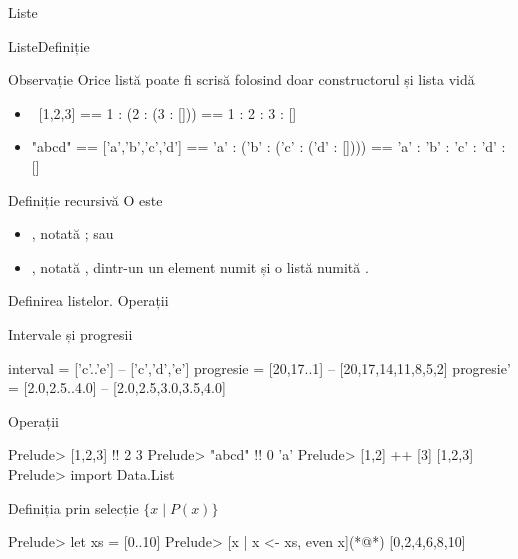 \documentclass[xcolor=pdftex,romanian,colorlinks]{beamer}
\begin{document}
\begin{section}{Liste}
\begin{frame}{Liste}{Definiție}
\begin{block}
{Observație}
Orice listă poate fi scrisă folosind doar constructorul \structure{(:)} și lista vidă \structure{[]}
\begin{itemize}
\item\ [1,2,3] == 1 : (2 : (3 : [])) == 1 : 2 : 3 : []
\item "abcd" == ['a','b','c','d'] == 'a' : ('b' : ('c' : ('d' : []))) == 'a' : 'b' : 'c' : 'd' : []
\end{itemize}
\end{block}
\vfill
\begin{block}{Definiție recursivă}
O  este
\begin{itemize}
\item {}, notată \structure{[]}; sau
\item {}, notată , dintr-un un element  numit  și o listă  numită .
\end{itemize}
\end{block}
\vfill
\end{frame}

\begin{frame}[fragile]{Definirea listelor. Operații}
\begin{block}{ Intervale și progresii}
\begin{asciihs}
interval = ['c'..'e']       -- ['c','d','e']
progresie = [20,17..1]      -- [20,17,14,11,8,5,2]
progresie' = [2.0,2.5..4.0] -- [2.0,2.5,3.0,3.5,4.0]
\end{asciihs}
\end{block}
\pause
\begin{block}{Operații}
\begin{asciihs}
Prelude> [1,2,3] !! 2
3
Prelude> "abcd" !! 0
'a'
Prelude> [1,2] ++ [3]
[1,2,3]
Prelude> import Data.List
\end{asciihs}
\end{block}
\end{frame}

\begin{frame}[fragile]{Definiția prin selecție $\{x\mid P(x)\}$}
\structure{[E(x)| x <- [x1,…,xn], P(x)]}

\begin{asciihs}
Prelude> let xs = [0..10]
Prelude> [x | x <- xs, even x](*@\pause@*)
[0,2,4,6,8,10]


\end{asciihs}
\end{frame}
\end{section}
\end{document}
